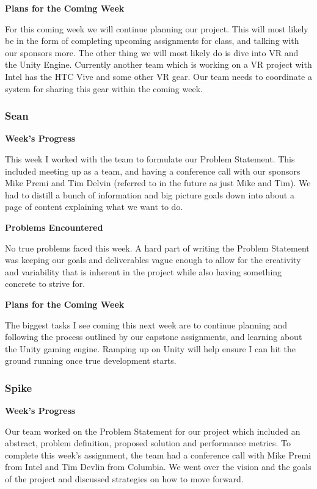 \documentclass[10pt,journal,compsoc,onecolumn, draftclsnofoot]{IEEEtran}
\begin{document}
\noindent \textbf{Plans for the Coming Week}

For this coming week we will continue planning our project. This will most likely be in the form of completing upcoming assignments for class, and talking with our sponsors more. The other thing we will most likely do is dive into VR and the Unity Engine. Currently another team which is working on a VR project with Intel has the HTC Vive and some other VR gear. Our team needs to coordinate a system for sharing this gear within the coming week.

\subsubsection{Sean}
\noindent \textbf{Week's Progress}

This week I worked with the team to formulate our Problem Statement. This included meeting up as a team, and having a conference call with our sponsors Mike Premi and Tim Delvin (referred to in the future as just Mike and Tim). We had to distill a bunch of information and big picture goals down into about a page of content explaining what we want to do.

\noindent \textbf{Problems Encountered}

No true problems faced this week.  A hard part of writing the Problem Statement was keeping our goals and deliverables vague enough to allow for the creativity and variability that is inherent in the project while also having something concrete to strive for.

\noindent \textbf{Plans for the Coming Week}

The biggest tasks I see coming this next week are to continue planning and following the process outlined by our capstone assignments, and learning about the Unity gaming engine.  Ramping up on Unity will help ensure I can hit the ground running once true development starts.

\subsubsection{Spike}
\noindent \textbf{Week's Progress}

Our team worked on the Problem Statement for our project which included an abstract, problem definition, proposed solution and performance metrics. To complete this week's assignment, the team had a conference call with Mike Premi from Intel and Tim Devlin from Columbia. We went over the vision and the goals of the project and discussed strategies on how to move forward.
\end{document}
